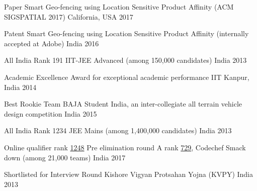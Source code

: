 
\begin{cvhonors}
	\cvhonor
	{Paper} %
	{Smart Geo-fencing using Location Sensitive Product Affinity (ACM SIGSPATIAL 2017)} %
	{California, USA} %
	{2017} %
	
	\cvhonor
	{Patent} %
	{Smart Geo-fencing using Location Sensitive Product Affinity (internally accepted at Adobe)} %
	{India} %
	{2016} %
	
	\cvhonor
	{All India Rank 191 } %
	{IIT-JEE Advanced (among 150,000 candidates)} %
	{India} %
	{2013} %
	
	\cvhonor
	{Academic Excellence Award} %
	{for exceptional academic performance} %
	{IIT Kanpur, India} %
	{2014} %
	
	\cvhonor
	{Best Rookie Team} %
	{BAJA Student India, an inter-collegiate all terrain vehicle design competition} %
	{India} %
	{2015} %
	
	\cvhonor
	{All India Rank 1234} %
	{JEE Mains (among 1,400,000 candidates)} %
	{India} %
	{2013} %
	
	\cvhonor
	{Online qualifier rank 
	\href{https://www.codechef.com/rankings/SNCKQL17?order=asc&search=agartudu&sortBy=rank}{1248}
	} %
	{Pre elimination round A rank \href{https://www.codechef.com/rankings/SNCKPA17?order=asc&search=agartudu&sortBy=rank}{729}, Codechef Smack down (among 21,000 teams)} %
	{India} %
	{2017} %
	
	\cvhonor
	{Shortlisted for Interview Round} %
	{Kishore Vigyan Protsahan Yojna (KVPY)} %
	{India} %
	{2013} %
	
\end{cvhonors}